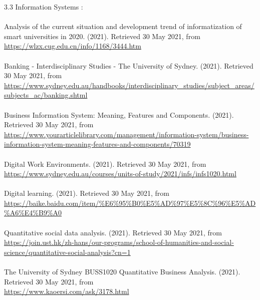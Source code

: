 \documentclass{article}
\begin{document}
	
	3.3 Information Systems : \\
	\\
	Analysis of the current situation and development trend of informatization of smart universities in 2020. (2021). Retrieved 30 May 2021, from \\
	\url{https://wlzx.cug.edu.cn/info/1168/3444.htm }\\
	\\
	Banking - Interdisciplinary Studies - The University of Sydney. (2021). Retrieved 30 May 2021, from \\
	\url{https://www.sydney.edu.au/handbooks/interdisciplinary_studies/subject_areas/subjects_ac/banking.shtml }\\
	\\
	Business Information System: Meaning, Features and Components. (2021). Retrieved 30 May 2021, from \\
	\url{https://www.yourarticlelibrary.com/management/information-system/business-information-system-meaning-features-and-components/70319 }\\
	\\
	Digital Work Environments. (2021). Retrieved 30 May 2021, from \\
	\url{ https://www.sydney.edu.au/courses/units-of-study/2021/infs/infs1020.html }\\
	\\
	Digital learning. (2021). Retrieved 30 May 2021, from\\
	\url{ https://baike.baidu.com/item/%E6%95%B0%E5%AD%97%E5%8C%96%E5%AD%A6%E4%B9%A0 } \\
	\\
	Quantitative social data analysis. (2021). Retrieved 30 May 2021, from \\
	\url{ https://join.ust.hk/zh-hans/our-programs/school-of-humanities-and-social-science/quantitative-social-analysis?cn=1 } \\
	\\
	The University of Sydney BUSS1020 Quantitative Business Analysis. (2021). Retrieved 30 May 2021, from \\
	\url{https://www.kaoersi.com/ask/3178.html }\\
	\\
	
\end{document}
